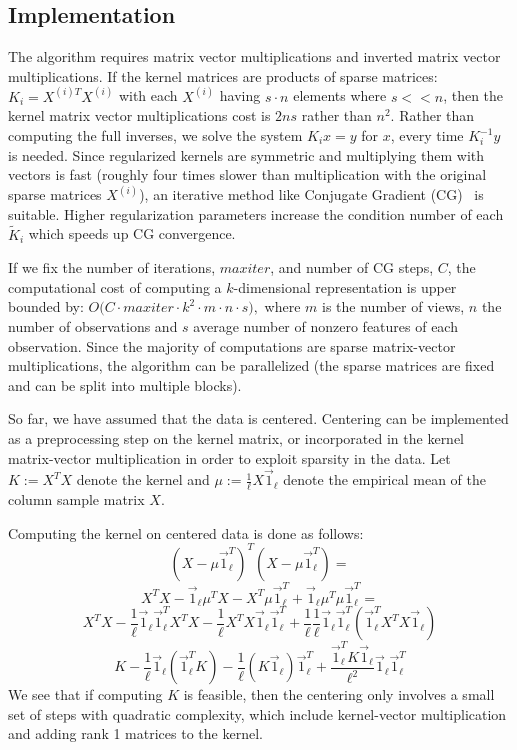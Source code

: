 \subsection{Implementation}\label{subsec:implementation}
The algorithm requires matrix vector multiplications and inverted
matrix vector multiplications. If the kernel matrices are products of
sparse matrices: $K_i = X^{(i)T} X^{(i)}$ with each $X^{(i)}$ having
$s\cdot n$ elements
where $s << n$, then the kernel matrix vector multiplications cost is $2 n s$
rather than $n^2$. Rather than computing the full inverses, we solve
the system $K_i x = y$ for $x$, every time $K_i^{-1} y$ is needed. Since
regularized kernels are symmetric and multiplying them with vectors is
fast (roughly four times slower than multiplication with the original 
sparse matrices $X^{(i)}$), an iterative method like Conjugate Gradient (CG)~\cite{golub} is
suitable. Higher regularization parameters increase the condition
number of each $\tilde{K}_i$ which speeds up CG convergence.
\par
If we fix the number of iterations, $maxiter$, and number
of CG steps, $C$, the computational cost of computing a
$k$-dimensional representation is upper bounded by: $O\big(C \cdot
maxiter \cdot k^2 \cdot m \cdot n \cdot s \big),$ where $m$ is the
number of views, $n$ the number of observations and $s$ average number
of nonzero features of each observation.
Since the majority of computations are  sparse matrix-vector multiplications, the
algorithm can be parallelized (the sparse matrices are fixed and can be split into multiple
blocks).

So far, we have assumed that the data is centered. Centering can be implemented
as a preprocessing step on the kernel matrix, or incorporated in the kernel
matrix-vector multiplication in order to exploit sparsity in the data.
Let $K := X^T X$ denote the kernel and $\mu := \frac{1}{\ell} X \vec{1}_\ell$ 
denote the empirical mean of the column sample matrix $X$. 

Computing the kernel on centered data is done as follows:
$$(X - \mu \vec{1}_\ell^T)^T (X - \mu \vec{1}_\ell^T) = $$
$$X^T X  - \vec{1}_\ell \mu^T X  - X^T \mu \vec{1}_\ell^T  +  \vec{1}_\ell \mu^T \mu \vec{1}_\ell^T = $$
$$ X^T X - \frac{1}{\ell} \vec{1}_\ell \vec{1}_\ell^T X^T X  -  \frac{1}{\ell} X^T X \vec{1}_\ell \vec{1}_\ell^T  
+ \frac{1}{\ell} \frac{1}{\ell} \vec{1}_\ell \vec{1}_\ell^T (\vec{1}_\ell^T X^T X \vec{1}_\ell)$$
$$ K - \frac{1}{\ell} \vec{1}_\ell (\vec{1}_\ell^T K) - \frac{1}{\ell} (K \vec{1}_\ell)\vec{1}_\ell^T + 
\frac{\vec{1}_\ell^T K \vec{1}_\ell}{\ell^2} \vec{1}_\ell \vec{1}_\ell^T$$
We see that if computing $K$ is feasible, then the centering only involves a small set of
steps with quadratic complexity, which include kernel-vector multiplication and adding rank 1 matrices to the kernel.

